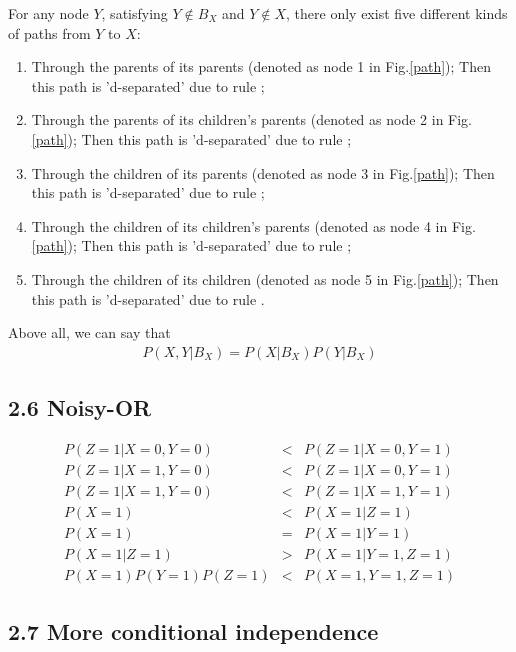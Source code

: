 \documentclass{article}
\newcommand{\RNum}[1]{\uppercase\expandafter{\romannumeral #1\relax}}
\begin{document}
For any node $Y$, satisfying $Y \notin B_X$ and $Y \notin X$, there only exist five different kinds of paths from $Y$ to $X$:

\begin{enumerate}
	\item
	Through the parents of its parents (denoted as node 1 in Fig.\ref{path}); Then this path is 'd-separated' due to rule \RNum{1};
	\item
	Through the parents of its children's parents (denoted as node 2 in Fig.\ref{path}); Then this path is 'd-separated' due to rule \RNum{1};
	\item
	Through the children of its parents (denoted as node 3 in Fig.\ref{path}); Then this path is 'd-separated' due to rule \RNum{2};
	\item
	Through the children of its children's parents (denoted as node 4 in Fig.\ref{path}); Then this path is 'd-separated' due to rule \RNum{2};
	\item
	Through the children of its children (denoted as node 5 in Fig.\ref{path}); Then this path is 'd-separated' due to rule \RNum{1}.
\end{enumerate}

Above all, we can say that 
\begin{eqnarray*}
	P(X,Y|B_X) = P(X|B_X)P(Y|B_X)
\end{eqnarray*}

\subsection*{2.6 Noisy-OR}
\begin{eqnarray*}
	P(Z=1|X=0,Y=0) & < & P(Z=1|X=0,Y=1)\\
	P(Z=1|X=1,Y=0) & < & P(Z=1|X=0,Y=1)\\
	P(Z=1|X=1,Y=0) & < & P(Z=1|X=1,Y=1)\\
	P(X=1) & < & P(X=1|Z=1)\\
	P(X=1) & = & P(X=1|Y=1)\\
	P(X=1|Z=1) & > & P(X=1|Y=1,Z=1)\\
	P(X=1)P(Y=1)P(Z=1) & < & P(X=1, Y=1, Z=1)
\end{eqnarray*}





\subsection*{2.7 More conditional independence}
\end{document}
